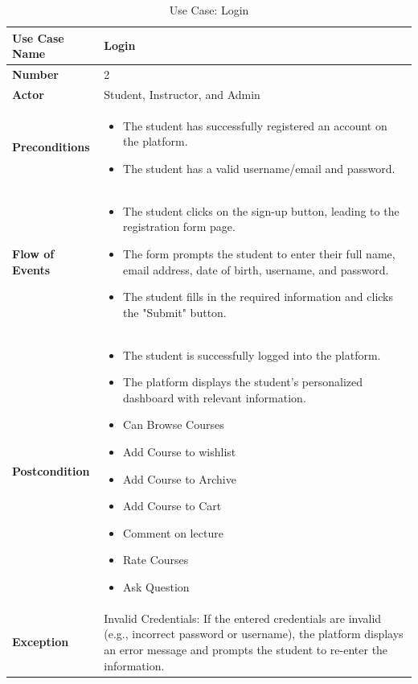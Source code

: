 \begin{table}[h!]
    \centering
    \caption{Use Case: Login}
    \bgroup
    \def\arraystretch{1.5}%
    \begin{tabular}{|m{4cm}|m{11cm}|}
        \hline
        \textbf{Use Case Name} & Login \\
        \hline
        \textbf{Number} & 2 \\
        \hline
        \textbf{Actor} & Student, Instructor, and Admin \\
        \hline
        \textbf{Preconditions} & 
        \begin{itemize}[noitemsep,topsep=0pt] %
            \item The student has successfully registered an account on the platform.
            \item The student has a valid username/email and password.
        \end{itemize} \\
        \hline
        \textbf{Flow of Events} & 
        \begin{itemize}[noitemsep,topsep=0pt]
            \item The student clicks on the sign-up button, leading to the registration form page.
            \item The form prompts the student to enter their full name, email address, date of birth, username, and password.
            \item The student fills in the required information and clicks the "Submit" button.
        \end{itemize} \\
        \hline
        \textbf{Postcondition} & 
        \begin{itemize}[noitemsep,topsep=0pt]
            \item The student is successfully logged into the platform.
            \item The platform displays the student's personalized dashboard with relevant information.
            \item Can Browse Courses
            \item Add Course to wishlist
            \item Add Course to Archive
            \item Add Course to Cart
            \item Comment on lecture
            \item Rate Courses
            \item Ask Question
        \end{itemize} \\
        \hline
        \textbf{Exception} & 
        Invalid Credentials: If the entered credentials are invalid (e.g., incorrect password or username), the platform displays an error message and prompts the student to re-enter the information. \\
        \hline
    \end{tabular}
    \egroup
\end{table}

